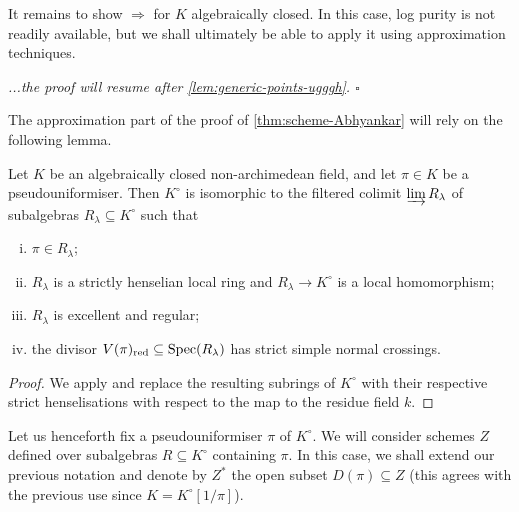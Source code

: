 It remains to show $\Rightarrow$ for $K$ algebraically closed. In this case, log purity is not readily available, but we shall ultimately be able to apply it using approximation techniques. 

\hphantom{a} \hfill \emph{...the proof will resume after \cref{lem:generic-points-ugggh}. $\square$}  

\medskip

The approximation part of the proof of \cref{thm:scheme-Abhyankar} will rely on the following lemma. 

\begin{lem}[Zavyalov] \label{lem:Zavyalov}
    Let $K$ be an algebraically closed non-archimedean field, and let $\pi\in K$ be a pseudouniformiser. Then $K^\circ$ is isomorphic to the filtered colimit $\varinjlim R_\lambda$ of subalgebras $R_\lambda\subseteq K^\circ$ such that
    \begin{enumerate}[(i)]
        \item $\pi \in R_\lambda$;
        \item $R_\lambda$ is a strictly henselian local ring and $R_\lambda\to K^\circ$ is a local homomorphism;
        \item $R_\lambda$ is excellent and regular;
        \item the divisor $V(\pi)_{\rm red}\subseteq \operatorname{Spec}(R_\lambda)$ has strict simple normal crossings.
    \end{enumerate}
\end{lem}

\begin{proof}
We apply \cite[Lemma~A.2]{Zavyalov} and replace the resulting subrings of $K^\circ$ with their respective strict henselisations with respect to the map to the residue field $k$.
\end{proof}

Let us henceforth fix a pseudouniformiser $\pi$ of $K^\circ$. We will consider schemes $Z$ defined over subalgebras $R\subseteq K^\circ$ containing $\pi$. In this case, we shall extend our previous notation and denote by $Z^*$ the open subset $D(\pi)\subseteq Z$ (this agrees with the previous use since $K= K^\circ[1/\pi]$).

